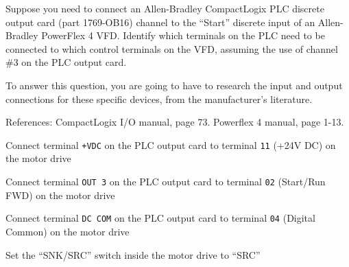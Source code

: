 

Suppose you need to connect an Allen-Bradley CompactLogix PLC discrete output card (part 1769-OB16) channel to the ``Start'' discrete input of an Allen-Bradley PowerFlex 4 VFD.  Identify which terminals on the PLC need to be connected to which control terminals on the VFD, assuming the use of channel \#3 on the PLC output card.







To answer this question, you are going to have to research the input and output connections for these specific devices, from the manufacturer's literature.







References: CompactLogix I/O manual, page 73.  Powerflex 4 manual, page 1-13.

\vskip 30pt

Connect terminal {\tt +VDC} on the PLC output card to terminal {\tt 11} (+24V DC) on the motor drive

\vskip 10pt

Connect terminal {\tt OUT 3} on the PLC output card to terminal {\tt 02} (Start/Run FWD) on the motor drive

\vskip 10pt

Connect terminal {\tt DC COM} on the PLC output card to terminal {\tt 04} (Digital Common) on the motor drive

\vskip 10pt

Set the ``SNK/SRC'' switch inside the motor drive to ``SRC''



